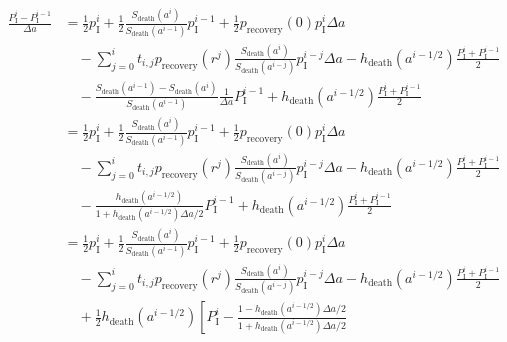 \documentclass[12pt]{article}
\begin{document}
\begin{equation}
  \begin{split}
    \frac{P_{\mathrm{I}}^i - P_{\mathrm{I}}^{i - 1}}{\Delta a}
    &= \frac{1}{2} p_{\mathrm{I}}^i
    + \frac{1}{2}
    \frac{S_{\text{death}}(a^i)}{S_{\text{death}}(a^{i - 1})}
    p_{\mathrm{I}}^{i - 1}
    + \frac{1}{2} p_{\text{recovery}}(0) p_{\mathrm{I}}^i \Delta a
    \\ & \quad {}
    - \sum_{j = 0}^i t_{i, j} p_{\text{recovery}}(r^j)
    \frac{S_{\text{death}}(a^i)}{S_{\text{death}}(a^{i - j})}
    p_{\mathrm{I}}^{i - j} \Delta a
    - h_{\text{death}}(a^{i - 1 / 2})
    \frac{P_{\mathrm{I}}^i + P_{\mathrm{I}}^{i - 1}}{2}
    \\ & \quad {}
    - \frac{S_{\text{death}}(a^{i - 1}) - S_{\text{death}}(a^i)}
    {S_{\text{death}}(a^{i - 1})}
    \frac{1}{\Delta a} P_{\mathrm{I}}^{i - 1}
    + h_{\text{death}}(a^{i - 1 / 2})
    \frac{P_{\mathrm{I}}^i + P_{\mathrm{I}}^{i - 1}}{2}
    \\
    &= \frac{1}{2} p_{\mathrm{I}}^i
    + \frac{1}{2}
    \frac{S_{\text{death}}(a^i)}{S_{\text{death}}(a^{i - 1})}
    p_{\mathrm{I}}^{i - 1}
    + \frac{1}{2} p_{\text{recovery}}(0) p_{\mathrm{I}}^i \Delta a
    \\ & \quad {}
    - \sum_{j = 0}^i t_{i, j} p_{\text{recovery}}(r^j)
    \frac{S_{\text{death}}(a^i)}{S_{\text{death}}(a^{i - j})}
    p_{\mathrm{I}}^{i - j} \Delta a
    - h_{\text{death}}(a^{i - 1 / 2})
    \frac{P_{\mathrm{I}}^i + P_{\mathrm{I}}^{i - 1}}{2}
    \\ & \quad {}
    - \frac{h_{\text{death}}(a^{i - 1 / 2})}
    {1 + h_{\text{death}}(a^{i - 1 / 2}) \Delta a / 2}
    P_{\mathrm{I}}^{i - 1}
    + h_{\text{death}}(a^{i - 1 / 2})
    \frac{P_{\mathrm{I}}^i + P_{\mathrm{I}}^{i - 1}}{2}
    \\
    &= \frac{1}{2} p_{\mathrm{I}}^i
    + \frac{1}{2}
    \frac{S_{\text{death}}(a^i)}{S_{\text{death}}(a^{i - 1})}
    p_{\mathrm{I}}^{i - 1}
    + \frac{1}{2} p_{\text{recovery}}(0) p_{\mathrm{I}}^i \Delta a
    \\ & \quad {}
    - \sum_{j = 0}^i t_{i, j} p_{\text{recovery}}(r^j)
    \frac{S_{\text{death}}(a^i)}{S_{\text{death}}(a^{i - j})}
    p_{\mathrm{I}}^{i - j} \Delta a
    - h_{\text{death}}(a^{i - 1 / 2})
    \frac{P_{\mathrm{I}}^i + P_{\mathrm{I}}^{i - 1}}{2}
    \\ & \quad {}
    + \frac{1}{2} h_{\text{death}}(a^{i - 1 / 2})
    \left[
      P_{\mathrm{I}}^i
      - \frac{1 - h_{\text{death}}(a^{i - 1 / 2}) \Delta a / 2}
      {1 + h_{\text{death}}(a^{i - 1 / 2}) \Delta a / 2}

\end{split}
\end{equation}
\end{document}
